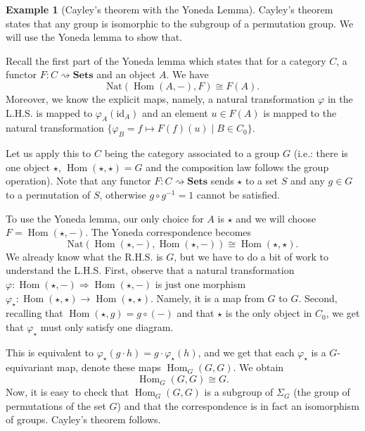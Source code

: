 \documentclass{scrartcl}
\theoremstyle{definition}
\newtheorem{exmp}[thm]{Example}
\theoremstyle{remark}
\DeclareMathOperator{\Hom}{Hom}
\newcommand{\id}{\text{id}}
\begin{document}
\begin{exmp}[Cayley's theorem with the Yoneda Lemma]
Cayley's theorem states that any group is isomorphic to the subgroup of a permutation group. We will use the Yoneda lemma to show that.

Recall the first part of the Yoneda lemma which states that for a category $C$, a functor $F:C \rightsquigarrow \textbf{Sets}$ and an object $A$. We have $$\text{Nat}(\Hom(A, -), F) \cong F(A).$$Moreover, we know the explicit maps, namely, a natural transformation $\varphi$ in the L.H.S. is mapped to $\varphi_A(\id_A)$ and an element $u \in F(A)$ is mapped to the natural transformation $\{\varphi_B = f \mapsto F(f)(u) \mid B \in C_0\}$.

Let us apply this to $C$ being the category associated to a group $G$ (i.e.: there is one object $\star$, $\Hom(\star, \star) = G$ and the composition law follows the group operation). Note that any functor $F: C\rightsquigarrow \textbf{Sets}$ sends $\star$ to a set $S$ and any $g \in G$ to a permutation of $S$, otherwise $g\circ g^{-1} = 1$ cannot be satisfied.

To use the Yoneda lemma, our only choice for $A$ is $\star$ and we will choose $F = \Hom(\star, -)$. The Yoneda correspondence becomes
$$ \text{Nat}(\Hom(\star, -), \Hom(\star,-)) \cong \Hom(\star, \star).$$
We already know what the R.H.S. is $G$, but we have to do a bit of work to understand the L.H.S. First, observe that a natural transformation $\varphi: \Hom(\star, -) \Rightarrow \Hom(\star, -)$ is just one morphism $\varphi_{\star}: \Hom(\star, \star) \rightarrow \Hom(\star, \star)$. Namely, it is a map from $G$ to $G$. Second, recalling that $\Hom(\star, g) = g \circ (-)$ and that $\star$ is the only object in $C_0$, we get that $\varphi_{\star}$ must only satisfy one diagram.
\begin{figure}[H]
    \centering
\end{figure}
This is equivalent to $\varphi_{\star}(g \cdot h) = g \cdot \varphi_{\star}(h)$, and we get that each $\varphi_{\star}$ is a $G$-equivariant map, denote these maps $\Hom_G(G,G)$. We obtain
$$\Hom_G(G,G) \cong G.$$
Now, it is easy to check that $\Hom_G(G,G)$ is a subgroup of $\Sigma_G$ (the group of permutations of the set $G$) and that the correspondence is in fact an isomorphism of groups. Cayley's theorem follows.


\end{exmp}
\end{document}
